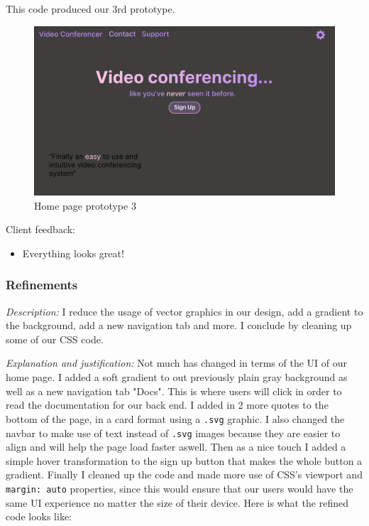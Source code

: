 This code produced our 3rd prototype.

\begin{figure}[H]
\centering

\includegraphics[scale=0.2]{Images/Proto_home3.png}

\caption{Home page prototype 3}
\end{figure}

{\color{gray} \hrulefill} \vspace{0.2cm}

{\sffamily Client feedback:}

\begin{itemize}
  \item Everything looks great!
\end{itemize}

{\color{gray} \hrulefill}

\subsubsection{Refinements}

\textit{Description:}
I reduce the usage of vector graphics in our design,
add a gradient to the background, add a new navigation
tab and more. I conclude by cleaning up some of our CSS
code. \\ \vspace{0.2cm}

\textit{Explanation and justification:}
Not much has changed in terms of the UI of our home
page. I added a soft gradient to out previously plain
gray background as well as a new navigation tab "Docs".
This is where users will click in order to read the
documentation for our back end. I added in 2
more quotes to the bottom of the page, in a card
format using a \texttt{.svg} graphic. I also changed
the navbar to make use of text instead of
\texttt{.svg} images because they are easier to align
and will help the page load faster aswell. Then as a nice
touch I added a simple hover transformation to the sign up
button that makes the whole button a gradient. Finally I
cleaned up the code and made more use of CSS's
viewport and \texttt{margin: auto} properties, since
this would ensure that our users would have the same
UI experience no matter the size of their device. Here
is what the refined code looks like: \\ \vspace{0.2cm}

